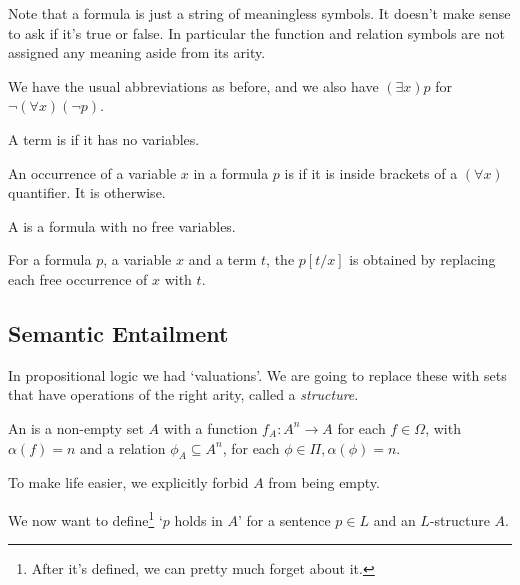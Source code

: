 \documentclass[a4paper, 10pt, twocolumn]{amsart}
\begin{document}
Note that a formula is just a string of meaningless symbols. It doesn't make sense to ask if it's true or false. In particular the function and relation symbols are not assigned any meaning aside from its arity. 

We have the usual abbreviations as before, and we also have $(\exists x) p$ for $\lnot (\forall x)(\lnot p)$.

\begin{definition}
  A term is  if it has no variables.
\end{definition}

\begin{definition}
  An occurrence of a variable $x$ in a formula $p$ is  if it is inside brackets of a $(\forall x)$ quantifier. It is  otherwise.
\end{definition}

\begin{definition}[Sentence]
  A  is a formula with no free variables.
\end{definition}

\begin{definition}[Substitution]
  For a formula $p$, a variable $x$ and a term $t$, the  $p[t/x]$ is obtained by replacing each free occurrence of $x$ with $t$.
\end{definition}

\subsection{Semantic Entailment}

In propositional logic we had `valuations'. We are going to replace these with sets that have operations of the right arity, called a \emph{structure}. 

\begin{definition}[Structure]
  An  is a non-empty set $A$ with a function $f_A: A^n \rightarrow A$ for each $f \in \Omega$, with $\alpha(f) = n$ and a relation $\phi_A \subseteq A^n$, for each $\phi \in \Pi, \alpha(\phi) = n$.
\end{definition}

\begin{remark}
  To make life easier, we explicitly forbid $A$ from being empty. 
\end{remark}

We now want to define\footnote{After it's defined, we can pretty much forget about it.} `$p$ holds in $A$' for a sentence $p \in L$ and an $L$-structure $A$.
\end{document}
